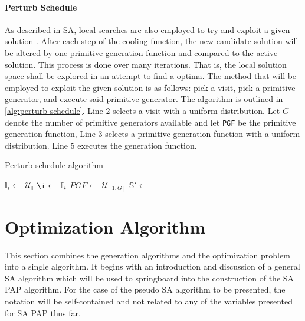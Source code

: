 \documentclass[11pt,a4paper,final]{article}
\newcommand{\I}{\mathbb{I}}                 %
\newcommand{\C}{\mathbb{C}}                 %
\newcommand{\U}{\mathcal{U}}                %
\newcommand{\Sol}{\mathbb{S}}               %
\begin{document}
\paragraph{Perturb Schedule}
\label{sec:tweak-schedule}
As described in SA, local searches are also employed to try and exploit a given solution
\cite{radosavljevic-2018-metah-optim}. After each step of the cooling function, the new candidate solution will be
altered by one primitive generation function and compared to the active solution. This process is done over many
iterations. That is, the local solution space shall be explored in an attempt to find a optima. The method that will be
employed to exploit the given solution is as follows: pick a visit, pick a primitive generator, and execute said
primitive generator. The algorithm is outlined in \ref{alg:perturb-schedule}. Line 2 selects a visit with a uniform
distribution. Let \(G\) denote the number of primitive generators available and let \texttt{PGF} be the primitive generation
function, Line 3 selects a primitive generation function with a uniform distribution. Line 5 executes the generation
function.



\begin{algorithm}[H]
\caption{Perturb schedule algorithm} \label{alg:perturb-schedule}

    \LinesNumbered
    \KwIn{$\I$, $\C$}
    \KwOut{$\I_i'$, $\C'$}


    \Begin
    {
        $\I_i\leftarrow\; \U_{\I}$ 
        $\i\leftarrow\; \I_i$ 
        $PGF \leftarrow\; \U_{[1,G]}$ 
        $\Sol' \leftarrow$ \PGF{($i$, $\I$, $\C$)}  
        \Return{($\I'$, $\C'$)}
    }
\end{algorithm}
\section{Optimization Algorithm}
\label{sec:optimization-algorithm}
This section combines the generation algorithms and the optimization problem into a single algorithm. It begins with an
introduction and discussion of a general SA algorithm which will be used to springboard into the construction of the SA
PAP algorithm. For the case of the pseudo SA algorithm to be presented, the notation will be self-contained and
not related to any of the variables presented for SA PAP thus far.
\end{document}
